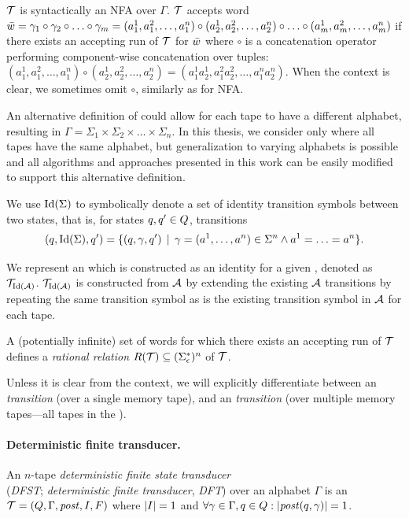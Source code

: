 \nft $\mathcal{T}$ is syntactically an NFA over $\Gamma$.
$\mathcal{T}$ accepts word $\bar{{w}} = \gamma_1 \circ \gamma_2 \circ \ldots \circ \gamma_m = (a^1_1, a^2_1, \ldots, a^n_1) \circ (a^1_2, a^2_2, \ldots, a^n_2) \circ \ldots \circ (a^1_m, a^2_m, \ldots, a^n_m) $
 if there exists an accepting run of $\mathcal{T}$ for $\bar{{w}}$ where $\circ$ is a concatenation operator performing component-wise concatenation over tuples:
$(a^1_1, a^2_1, \ldots, a^n_1) \circ (a^1_2, a^2_2, \ldots, a^n_2) = (a^1_1a^1_2, a^2_1a^2_2, \ldots, a^n_1a^n_2)$.
When the context is clear, we sometimes omit $\circ$, similarly as for NFA.

An alternative definition of \nfts could allow for each tape to have a different alphabet, resulting in $\Gamma = \Sigma_1 \times \Sigma_2 \times \ldots \times \Sigma_n$.
In this thesis, we consider only \nfts where all tapes have the same alphabet, but generalization to varying alphabets is possible and all algorithms and approaches presented in this work can be easily modified to support this alternative definition.

We use $\text{Id}(\Sigma)$ to symbolically denote a set of identity transition symbols between two states, that is, for states $q, q' \in Q$, transitions
$$(q, \text{Id}(\Sigma), q') = \{ (q, \gamma, q') \,\mid\, \gamma = (a^1, \ldots, a^n) \in \Sigma^n \land a^1 = \ldots = a^n \}\text{.}$$

We represent an \nft which is constructed as an identity \nft for a given \nfa, denoted as $\mathcal{T}_{\text{Id}(\mathcal{A})}$.
$\mathcal{T}_{\text{Id}(\mathcal{A})}$ is constructed from $\mathcal{A}$ by extending the existing $\mathcal{A}$ transitions by repeating the same transition symbol as is the existing transition symbol in $\mathcal{A}$ for each tape.

A (potentially infinite) set of words for which there exists an accepting run of $\mathcal{T}$ defines a \emph{rational relation} $R(\mathcal{T}) \subseteq (\Sigma_\epsilon^*)^n$ of \nft $\mathcal{T}$.

Unless it is clear from the context, we will explicitly differentiate between an \emph{\nfa transition} (over a single memory tape), and an \emph{\nft transition} (over multiple memory tapes---all tapes in the \nft).

\paragraph{Deterministic finite transducer.}
An $n$-tape \emph{deterministic finite state transducer}\\(\emph{DFST}; \emph{deterministic finite transducer}, \emph{DFT}) over an alphabet $\Gamma$ is an \\\nft $\mathcal{T} = (Q, \Gamma, \mathit{post}, I, F)$ where $|I| = 1$ and $\forall \gamma \in \Gamma, q \in Q: |\mathit{post}(q,\gamma)| = 1$.

